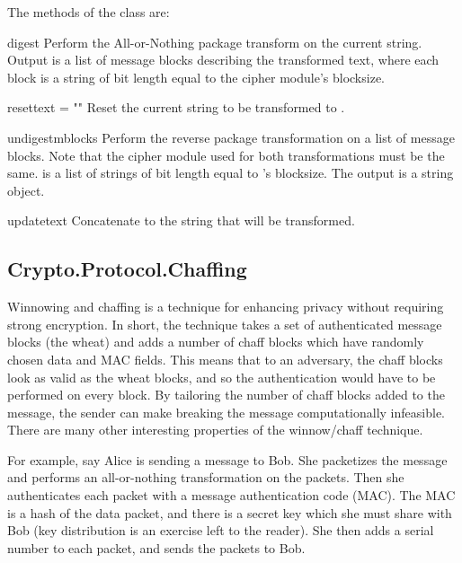 \documentclass{howto}
\begin{document}
The methods of the  class are:

\begin{methoddesc}{digest}{}
Perform the All-or-Nothing package transform on the current
string.  Output is a list of message blocks describing the
transformed text, where each block is a string of bit length equal
to the cipher module's blocksize.
\end{methoddesc}

\begin{methoddesc}{reset}{text = ""}
Reset the current string to be transformed to .
\end{methoddesc}

\begin{methoddesc}{undigest}{mblocks}
Perform the reverse package transformation on a list of message
blocks.  Note that the cipher module used for both transformations
must be the same.   is a list of strings of bit length
equal to 's blocksize.  The output is a string object.
\end{methoddesc}

\begin{methoddesc}{update}{text}
Concatenate  to the string that will be transformed.
\end{methoddesc}

\subsection{Crypto.Protocol.Chaffing}

Winnowing and chaffing is a technique for enhancing privacy without requiring
strong encryption.  In short, the technique takes a set of authenticated
message blocks (the wheat) and adds a number of chaff blocks which have
randomly chosen data and MAC fields.  This means that to an adversary, the
chaff blocks look as valid as the wheat blocks, and so the authentication
would have to be performed on every block.  By tailoring the number of chaff
blocks added to the message, the sender can make breaking the message
computationally infeasible.  There are many other interesting properties of
the winnow/chaff technique.

For example, say Alice is sending a message to Bob.  She packetizes the
message and performs an all-or-nothing transformation on the packets.  Then
she authenticates each packet with a message authentication code (MAC).  The
MAC is a hash of the data packet, and there is a secret key which she must
share with Bob (key distribution is an exercise left to the reader).  She then
adds a serial number to each packet, and sends the packets to Bob.
\end{document}
